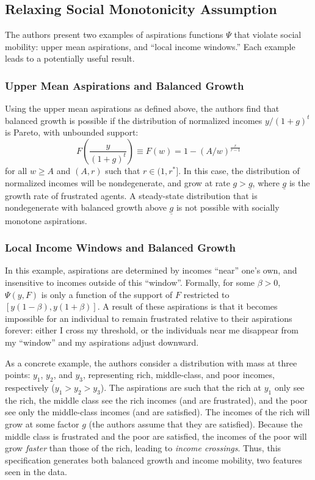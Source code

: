 \documentclass[11pt]{article}
\begin{document}
    \subsection{Relaxing Social Monotonicity Assumption}
    The authors present two examples of aspirations functions \( \Psi \) that violate social mobility: upper mean aspirations, and ``local income windows.'' Each example leads to a potentially useful result.
    \subsubsection{Upper Mean Aspirations and Balanced Growth} 
    Using the upper mean aspirations as defined above, the authors find that balanced growth is possible if the distribution of normalized incomes \( y / (1 + g)^t \) is Pareto, with unbounded support:
    \[F\left( \frac{y}{(1 + g)^t} \right) \equiv F(w) = 1 - (A / w)^{\frac{r}{r - 1}}\]
    for all \( w \geq A \) and \( (A,r) \) such that \( r \in (1, r^*] \). In this case, the distribution of normalized incomes will be nondegenerate, and grow at rate \( g > \underline{g} \), where \( \underline{g} \) is the growth rate of frustrated agents. A steady-state distribution that is nondegenerate with balanced growth above \( \underline{g} \) is not possible with socially monotone aspirations.

    \subsubsection{Local Income Windows and Balanced Growth}
    In this example, aspirations are determined by incomes ``near'' one's own, and insensitive to incomes outside of this ``window''. Formally, for some \( \beta > 0 \), \( \Psi(y, F) \) is only a function of the support of \( F \) restricted to \( [y(1 - \beta), y(1 + \beta)] \). A result of these aspirations is that it becomes impossible for an individual to remain frustrated relative to their aspirations forever: either I cross my threshold, or the individuals near me disappear from my ``window'' and my aspirations adjust downward. 
    
    As a concrete example, the authors consider a distribution with mass at three points: \( y_1 \), \( y_2 \), and \( y_3 \), representing rich, middle-class, and poor incomes, respectively (\( y_1 > y_2 > y_3 \)). The aspirations are such that the rich at \( y_1 \) only see the rich, the middle class see the rich incomes (and are frustrated), and the poor see only the middle-class incomes (and are satisfied). The incomes of the rich will grow at some factor \( g \) (the authors assume that they are satisfied). Because the middle class is frustrated and the poor are satisfied, the incomes of the poor will grow \textit{faster} than those of the rich, leading to \textit{income crossings}. Thus, this specification generates both balanced growth and income mobility, two features seen in the data. 
\end{document}
